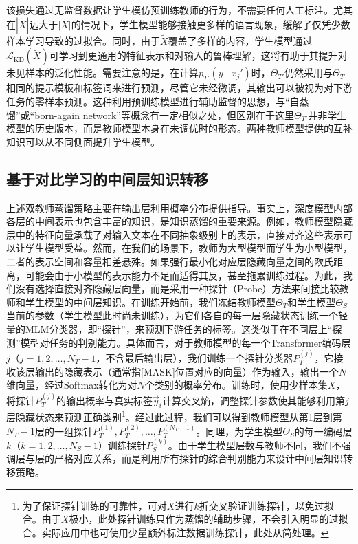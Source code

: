 \documentclass[../main.tex]{subfiles}
\begin{document}
该损失通过无监督数据让学生模仿预训练教师的行为，不需要任何人工标注。尤其在$|\tilde{X}|$远大于$|X|$的情况下，学生模型能够接触更多样的语言现象，缓解了仅凭少数样本学习导致的过拟合。同时，由于$\tilde{X}$覆盖了多样的内容，学生模型通过$\mathcal{L}_{\text{KD}}(\tilde{X})$可学习到更通用的特征表示和对输入的鲁棒理解，这将有助于其提升对未见样本的泛化性能。需要注意的是，在计算$p_{T'}(y \mid x_j')$时，$\Theta_{T'}$仍然采用与$\Theta_T$相同的提示模板和标签词来进行预测，尽管它未经微调，其输出可以被视为对下游任务的零样本预测。这种利用预训练模型进行辅助监督的思想，与“自蒸馏”或“born-again network”等概念有一定相似之处，但区别在于这里$\Theta_{T'}$并非学生模型的历史版本，而是教师模型本身在未调优时的形态。两种教师模型提供的互补知识可以从不同侧面提升学生模型。

\subsection{基于对比学习的中间层知识转移}
\label{sec:3-3-2}
上述双教师蒸馏策略主要在输出层利用概率分布提供指导。事实上，深度模型内部各层的中间表示也包含丰富的知识，是知识蒸馏的重要来源。例如，教师模型隐藏层中的特征向量承载了对输入文本在不同抽象级别上的表示，直接对齐这些表示可以让学生模型受益。然而，在我们的场景下，教师为大型模型而学生为小型模型，二者的表示空间和容量相差悬殊。如果强行最小化对应层隐藏向量之间的欧氏距离，可能会由于小模型的表示能力不足而适得其反，甚至拖累训练过程。为此，我们没有选择直接对齐隐藏层向量，而是采用一种探针（Probe）方法来间接比较教师和学生模型的中间层知识。在训练开始前，我们冻结教师模型$\Theta_T$和学生模型$\Theta_S$当前的参数（学生模型此时尚未训练），为它们各自的每一层隐藏状态训练一个轻量的MLM分类器，即“探针”，来预测下游任务的标签。这类似于在不同层上“探测”模型对任务的判别能力。具体而言，对于教师模型的每一个Transformer编码层$j$（$j=1,2,\dots,N_T-1$，不含最后输出层），我们训练一个探针分类器$P_T^{(j)}$，它接收该层输出的隐藏表示（通常指[MASK]位置对应的向量）作为输入，输出一个$N$维向量，经过Softmax转化为对$N$个类别的概率分布。训练时，使用少样本集$X$，将探针$P_T^{(j)}$的输出概率与真实标签$\vec{y}_i$计算交叉熵，调整探针参数使其能够利用第$j$层隐藏状态来预测正确类别\footnote{为了保证探针训练的可靠性，可对$X$进行$k$折交叉验证训练探针，以免过拟合。由于$X$极小，此处探针训练只作为蒸馏的辅助步骤，不会引入明显的过拟合。实际应用中也可使用少量额外标注数据训练探针，此处从简处理。}。经过此过程，我们可以得到教师模型从第1层到第$N_T-1$层的一组探针${P_T^{(1)}, P_T^{(2)}, \dots, P_T^{(N_T-1)}}$。同理，为学生模型$\Theta_S$的每一编码层$k$（$k=1,2,\dots,N_S-1$）训练探针$P_S^{(k)}$。由于学生模型层数与教师不同，我们不强调层与层的严格对应关系，而是利用所有探针的综合判别能力来设计中间层知识转移策略。
\end{document}
